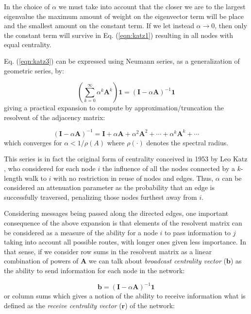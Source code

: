 In the choice of $\alpha$ we must take into account that the closer we are to the largest eigenvalue the maximum amount of weight on the eigenvector term will be place and the smallest amount on the constant term. If we let instead $\alpha\to 0$, then only the constant term will survive in Eq. (\ref{eqn:katz1}) resulting in all nodes with equal centrality.

Eq. (\ref{eqn:katz3}) can be expressed using Neumann series, as a generalization of geometric series, by: 

\begin{equation}
\label{eqn:katz4}
    \left(\sum_{k=0}^{\infty}\alpha^k \mathbf{A}^k\right)\mathbf{1} = (\mathbf{I}-\alpha\mathbf{A})^{-1}\mathbf{1}
\end{equation}
giving a practical expansion to compute by approximation/truncation the resolvent of the adjacency matrix:

\begin{equation}
\label{eqn:katz5}
    (\mathbf{I}-\alpha\mathbf{A})^{-1} = \mathbf{I} + \alpha\mathbf{A} + \alpha^2\mathbf{A}^2 + \cdots + \alpha^k\mathbf{A}^k + \cdots
\end{equation}
which converges for $\alpha<1/\rho(A)$ where $\rho(\cdot)$ denotes the spectral radius. 

This series is in fact the original form of centrality conceived in 1953 by Leo Katz  \cite{katz1953new}, who considered for each node $i$ the influence of all the nodes connected by a $k$-length walk to $i$ with no restriction in reuse of nodes and edges. Thus, $\alpha$ can be considered an attenuation parameter as the probability that an edge is successfully traversed, penalizing those nodes furthest away from $i$. 

Considering messages being passed along the directed edges, one important consequence of the above expansion is that elements of the resolvent matrix can be considered as a measure of the ability for a node $i$ to pass information to $j$ taking into account all possible routes, with longer ones given less importance. In that sense, if we consider row sums in the resolvent matrix as a linear combination of powers of $\mathbf{A}$ we can talk about \textit{broadcast centrality vector} ($\mathbf{b}$) as the ability to send information for each node in the network:  

\begin{equation}
\label{eqn:broad}
    \mathbf{b}=(\mathbf{I}-\alpha\mathbf{A})^{-1} \mathbf{1}
\end{equation}
or column sums which gives a notion of the ability to receive information what is defined as the \textit{receive centrality vector} ($\mathbf{r}$) of the network:

